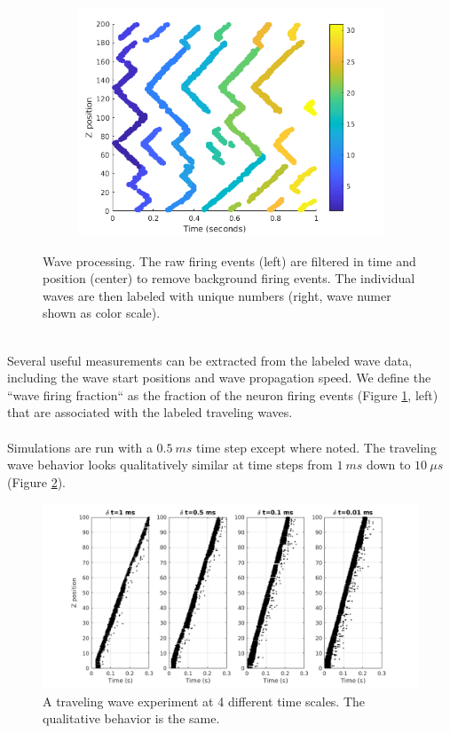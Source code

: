 \documentclass[a4paper,11pt]{article}
\begin{document}
\begin{figure}[!htb]
\begin{subfigure}{0.33\textwidth}
  \includegraphics[width=\textwidth]{fig/2x2_wave_IDs}
 \end{subfigure}%
 \caption{Wave processing. The raw firing events (left) are filtered in time and position (center) to remove background firing events. The individual waves are then labeled with unique numbers (right, wave numer shown as color scale).}
 \label{fig:wave_analysis}
\end{figure}
\\
Several useful measurements can be extracted from the labeled wave data, including the wave start positions and wave propagation speed.
We define the ``wave firing fraction`` as the fraction of the neuron firing events (Figure \ref{fig:wave_analysis}, left) that are associated with the labeled traveling waves.
\\ \\
Simulations are run with a $0.5~ms$ time step except where noted.
The traveling wave behavior looks qualitatively similar at time steps from $1~ms$ down to $10~\mu s$ (Figure \ref{fig:time_step}).
\begin{figure}[!htb]
 \centering
 \includegraphics[width=\textwidth]{fig/TimeStepEffect}
  \caption{A traveling wave experiment at 4 different time scales. The qualitative behavior is the same.}
 \label{fig:time_step}
\end{figure}
\end{document}
